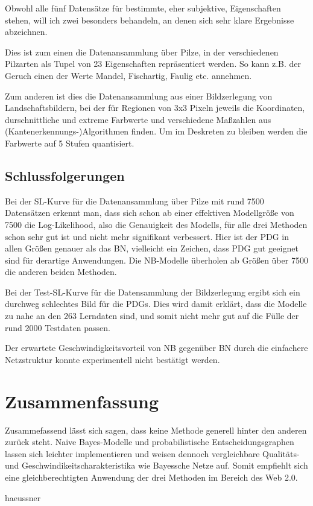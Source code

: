\documentclass{llncs}
\begin{document}
Obwohl alle fünf Datensätze für bestimmte, eher subjektive, Eigenschaften stehen, will ich zwei besonders behandeln, an denen sich sehr klare Ergebnisse abzeichnen. 

Dies ist zum einen die Datenansammlung über Pilze, in der verschiedenen Pilzarten als Tupel von 23 Eigenschaften repräsentiert werden. So kann z.B. der Geruch einen der Werte Mandel, Fischartig, Faulig etc. annehmen. 

Zum anderen ist dies die Datenansammlung aus einer Bildzerlegung von Landschaftsbildern, bei der für Regionen von 3x3 Pixeln jeweils die Koordinaten, durschnittliche und extreme Farbwerte und verschiedene Maßzahlen aus (Kantenerkennungs-)Algorithmen finden. Um im Deskreten zu bleiben werden die Farbwerte auf 5 Stufen quantisiert. 

\subsection{Schlussfolgerungen}

Bei der SL-Kurve für die Datenansammlung über Pilze mit rund 7500 Datensätzen erkennt man, dass sich schon ab einer effektiven Modellgröße von 7500 die Log-Likelihood, also die Genauigkeit des Modells, für alle drei Methoden schon sehr gut ist und nicht mehr signifikant verbessert. Hier ist der PDG in allen Größen genauer als das BN, vielleicht ein Zeichen, dass PDG gut geeignet sind für derartige Anwendungen. Die NB-Modelle überholen ab Größen über 7500 die anderen beiden Methoden. 

Bei der Test-SL-Kurve für die Datensammlung der Bildzerlegung ergibt sich ein durchweg schlechtes Bild für die PDGs. Dies wird damit erklärt, dass die Modelle zu nahe an den 263 Lerndaten sind, und somit nicht mehr gut auf die Fülle der rund 2000 Testdaten passen. 

Der erwartete Geschwindigkeitsvorteil von NB gegenüber BN durch die einfachere Netzstruktur konnte experimentell nicht bestätigt werden. 

\section{Zusammenfassung}

Zusammefassend lässt sich sagen, dass keine Methode generell hinter den anderen zurück steht. Naive Bayes-Modelle und probabilistische Entscheidungsgraphen lassen sich leichter implementieren und weisen dennoch vergleichbare Qualitäts- und Geschwindikeitscharakteristika wie Bayessche Netze auf. Somit empfiehlt sich eine gleichberechtigten Anwendung der drei Methoden im Bereich des Web 2.0. 

 {haeussner}

\end{document}

